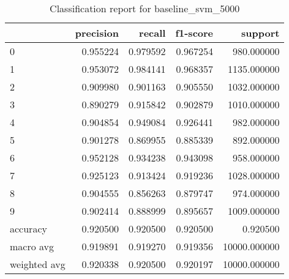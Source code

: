 \begin{table}[htb!]
\centering
\caption{Classification report for baseline_svm_5000}
\label{tab:classification-report-baseline_svm_5000}
\begin{tabular}{lrrrr}
\toprule
 & precision & recall & f1-score & support \\
\midrule
0 & 0.955224 & 0.979592 & 0.967254 & 980.000000 \\
1 & 0.953072 & 0.984141 & 0.968357 & 1135.000000 \\
2 & 0.909980 & 0.901163 & 0.905550 & 1032.000000 \\
3 & 0.890279 & 0.915842 & 0.902879 & 1010.000000 \\
4 & 0.904854 & 0.949084 & 0.926441 & 982.000000 \\
5 & 0.901278 & 0.869955 & 0.885339 & 892.000000 \\
6 & 0.952128 & 0.934238 & 0.943098 & 958.000000 \\
7 & 0.925123 & 0.913424 & 0.919236 & 1028.000000 \\
8 & 0.904555 & 0.856263 & 0.879747 & 974.000000 \\
9 & 0.902414 & 0.888999 & 0.895657 & 1009.000000 \\
accuracy & 0.920500 & 0.920500 & 0.920500 & 0.920500 \\
macro avg & 0.919891 & 0.919270 & 0.919356 & 10000.000000 \\
weighted avg & 0.920338 & 0.920500 & 0.920197 & 10000.000000 \\
\bottomrule
\end{tabular}
\end{table}
